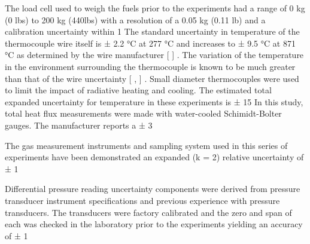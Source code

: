 \documentclass[12pt,oneside]{book}
\begin{document}
The load cell used to weigh the fuels prior to the experiments had a range of 0 kg (0 lbs) to 200 kg (440lbs) with a resolution of a 0.05 kg (0.11 lb) and a calibration uncertainty within 1%
The standard uncertainty in temperature of the thermocouple wire itself is  ± 2.2 °C at 277 °C and increases to ± 9.5 °C at 871 °C as determined by the wire manufacturer [ ] .  The variation of the temperature in the environment surrounding the thermocouple is known to be much greater than that of the wire uncertainty [ ,  ] .  Small diameter thermocouples were used to limit the impact of radiative heating and cooling.  The estimated total expanded uncertainty for temperature in these experiments is ± 15 %
In this study, total heat flux measurements were made with water-cooled Schimidt-Bolter gauges.  The manufacturer reports a ± 3 %

The gas measurement instruments and sampling system used in this series of experiments have been demonstrated an expanded (k = 2) relative uncertainty of ± 1 %

Differential pressure reading uncertainty components were derived from pressure transducer
instrument specifications and previous experience with pressure transducers. The transducers
were factory calibrated and the zero and span of each was checked in the laboratory prior to the
experiments yielding an accuracy of ± 1 %
\end{document}
